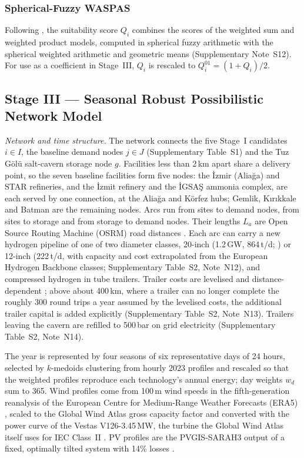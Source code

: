 \documentclass[preprint,12pt,authoryear]{elsarticle}
\begin{document}
\subsubsection{Spherical-Fuzzy WASPAS}
Following \citet{kutlugundogdu2019waspas}, the suitability score $Q_i$ combines the scores of the weighted sum and weighted product models, computed in spherical fuzzy arithmetic with the spherical weighted arithmetic and geometric means (Supplementary Note~S12).
For use as a coefficient in Stage~III, $Q_i$ is rescaled to $Q_i^{01} = (1 + Q_i)/2$.

\subsection{Stage III --- Seasonal Robust Possibilistic Network Model}

\textit{Network and time structure.} The network connects the five Stage~I candidates $i \in I$, the baseline demand nodes $j \in J$ (Supplementary Table~S1) and the Tuz Gölü salt-cavern storage node $g$. Facilities less than 2\,km apart share a delivery point, so the seven baseline facilities form five nodes: the İzmir (Aliağa) and STAR refineries, and the İzmit refinery and the İGSAŞ ammonia complex, are each served by one connection, at the Aliağa and Körfez hubs; Gemlik, Kırıkkale and Batman are the remaining nodes. Arcs run from sites to demand nodes, from sites to storage and from storage to demand nodes. Their lengths $L_a$ are Open Source Routing Machine (OSRM) road distances \citep{luxen2011real}. Each arc can carry a new hydrogen pipeline of one of two diameter classes, 20-inch (1.2\,GW, 864\,t/d; \citealp{ehb2022}) or 12-inch (222\,t/d, with capacity and cost extrapolated from the European Hydrogen Backbone classes; Supplementary Table~S2, Note~N12), and compressed hydrogen in tube trailers. Trailer costs are levelised and distance-dependent \citep{desnz2023transport}; above about 400\,km, where a trailer can no longer complete the roughly 300 round trips a year assumed by the levelised costs, the additional trailer capital is added explicitly (Supplementary Table~S2, Note~N13). Trailers leaving the cavern are refilled to 500\,bar on grid electricity (Supplementary Table~S2, Note~N14).

The year is represented by four seasons of six representative days of 24 hours, selected by $k$-medoids clustering \citep{kotzur2018impact} from hourly 2023 profiles and rescaled so that the weighted profiles reproduce each technology's annual energy; day weights $w_d$ sum to 365. Wind profiles come from 100\,m wind speeds in the fifth-generation reanalysis of the European Centre for Medium-Range Weather Forecasts (ERA5) \citep{hersbach2020era5}, scaled to the Global Wind Atlas gross capacity factor and converted with the power curve of the Vestas V126-3.45\,MW, the turbine the Global Wind Atlas itself uses for IEC Class~II \citep{davis2023global,windpowerlib2024}. PV profiles are the PVGIS-SARAH3 output of a fixed, optimally tilted system with 14\% losses \citep{huld2012pvgis}.
\end{document}
